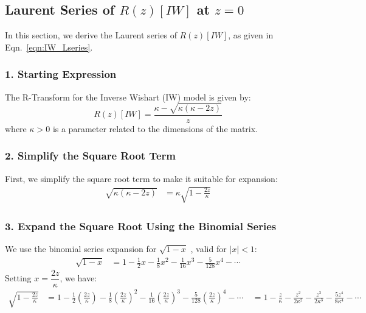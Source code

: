 \subsection{Laurent Series of $R(z)[IW]$ at $z = 0$}
\label{sxn:IW}

In this section, we derive the Laurent series of $R(z)[IW]$, as given in Eqn.~\ref{eqn:IW_Lseries}.

\subsubsection*{1. Starting Expression}

The R-Transform for the Inverse Wishart (IW) model is given by:
\begin{equation}
R(z)[IW] = \frac{\kappa - \sqrt{\kappa(\kappa - 2z)}}{z}
\end{equation}
where  $\kappa > 0$  is a parameter related to the dimensions of the matrix.

\subsubsection*{2. Simplify the Square Root Term}

First, we simplify the square root term to make it suitable for expansion:
\begin{align}
\sqrt{\kappa(\kappa - 2z)} &= \kappa \sqrt{1 - \frac{2z}{\kappa}}
\end{align}

\subsubsection*{3. Expand the Square Root Using the Binomial Series}

We use the binomial series expansion for  $\sqrt{1 - x}$ , valid for  $|x| < 1$:
\begin{align}
\sqrt{1 - x} &= 1 - \frac{1}{2} x - \frac{1}{8} x^2 - \frac{1}{16} x^3 - \frac{5}{128} x^4 - \cdots
\end{align}
Setting \( x = \dfrac{2z}{\kappa} \), we have:
\begin{align}
\sqrt{1 - \frac{2z}{\kappa}} &= 1 - \frac{1}{2} \left( \frac{2z}{\kappa} \right) - \frac{1}{8} \left( \frac{2z}{\kappa} \right)^2 - \frac{1}{16} \left( \frac{2z}{\kappa} \right)^3 - \frac{5}{128} \left( \frac{2z}{\kappa} \right)^4 - \cdots \
&= 1 - \frac{z}{\kappa} - \frac{z^2}{2\kappa^2} - \frac{z^3}{2\kappa^3} - \frac{5z^4}{8\kappa^4} - \cdots
\end{align}

